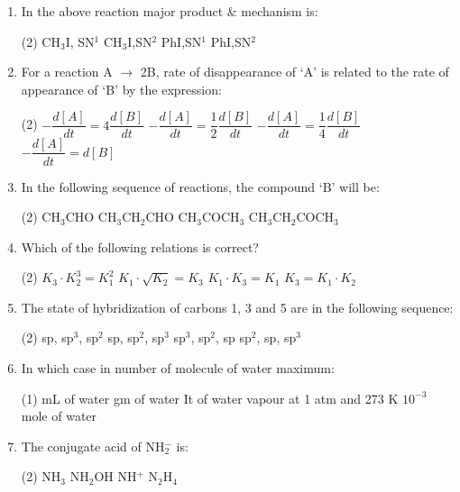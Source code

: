 \documentclass[twocolumn]{article}
\begin{document}
\begin{enumerate}
    \item In the above reaction major product \& mechanism is:
    \begin{tasks}(2)
        \task CH$_3$I, SN$^1$
        \task CH$_3$I,SN$^2$
        \task PhI,SN$^1$
        \task PhI,SN$^2$
    \end{tasks}
    \item For a reaction A $\rightarrow$ 2B, rate of disappearance of `A' is related to the rate of appearance of `B' by the expression:
    \begin{tasks}(2)
        \task $-\dfrac{d[A]}{dt} = 4 \dfrac{d[B]}{dt}$
        \task $-\dfrac{d[A]}{dt} = \dfrac{1}{2} \dfrac{d[B]}{dt}$
        \task $-\dfrac{d[A]}{dt} = \dfrac{1}{4} \dfrac{d[B]}{dt}$
        \task $-\dfrac{d[A]}{dt} = d[B]$
    \end{tasks}
    \item In the following sequence of reactions, the compound `B' will be:
    \begin{tasks}(2)
        \task CH$_3$CHO
        \task CH$_3$CH$_2$CHO
        \task CH$_3$COCH$_3$
        \task CH$_3$CH$_2$COCH$_3$
    \end{tasks}
    \item Which of the following relations is correct?
    \begin{tasks}(2)
        \task $K_3 \cdot K^3_2 = K^2_1$
        \task $K_1 \cdot \sqrt{K_2} = K_3$
        \task $K_1 \cdot K_3 = K_1$
        \task $K_3 = K_1 \cdot K_2$
    \end{tasks}
    \item The state of hybridization of carbons 1, 3 and 5 are in the following sequence:
    \begin{tasks}(2)
        \task sp, sp$^3$, sp$^2$
        \task sp, sp$^2$, sp$^3$
        \task sp$^3$, sp$^2$, sp
        \task sp$^2$, sp, sp$^3$
    \end{tasks}
    \item In which case in number of molecule of water maximum:
    \begin{tasks}(1)
         mL of water
         gm of water
         It of water vapour at 1 atm and 273 K
        \task $10^{-3}$ mole of water
    \end{tasks}
    \item The conjugate acid of NH$_2^-$ is:
    \begin{tasks}(2)
        \task NH$_3$
        \task NH$_2$OH
        \task NH$^+$
        \task N$_2$H$_4$
    \end{tasks}

\end{enumerate}
\end{document}
